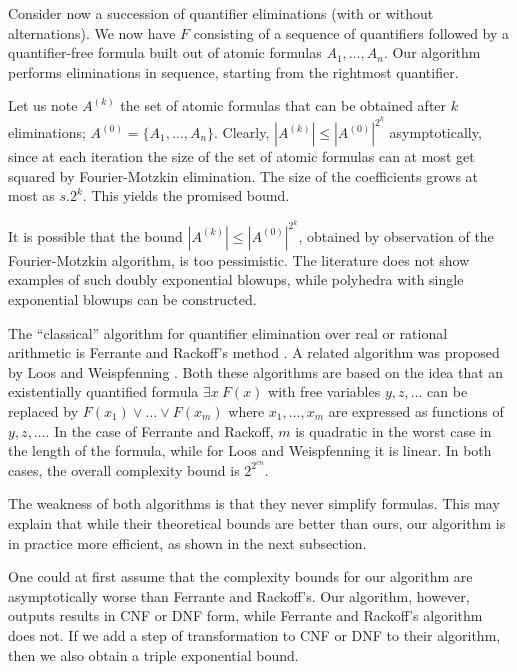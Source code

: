 Consider now a succession of quantifier eliminations (with or without alternations). We now have $F$ consisting of a sequence of quantifiers followed by a quantifier-free formula built out of atomic formulas $A_1,\dots,A_n$. Our algorithm performs eliminations in sequence, starting from the rightmost quantifier.

Let us note $A^{(k)}$ the set of atomic formulas that can be obtained after $k$ eliminations; $A^{(0)}=\{A_1,\dots,A_n\}$. Clearly, $|A^{(k)}| \leq |A^{(0)}|^{2^k}$ asymptotically, since at each iteration the size of the set of atomic formulas can at most get squared by Fourier-Motzkin elimination. The size of the coefficients grows at most as $s.2^k$. This yields the promised bound.

It is possible that the bound $|A^{(k)}| \leq |A^{(0)}|^{2^k}$, obtained by observation of the Fourier-Motzkin algorithm, is too pessimistic. The literature does not show examples of such doubly exponential blowups, while polyhedra with single exponential blowups can be constructed.









The ``classical'' algorithm for quantifier elimination over real or rational arithmetic is Ferrante and Rackoff's method \cite{FerranteRackoff75}\cite[\S 7.3]{BradleyManna07}\cite[\S 4.2]{NipkowIJCAR08}. A related algorithm was proposed by Loos and Weispfenning \cite{LoosWeispfenning93}\cite[\S 4.4]{NipkowIJCAR08}. Both these algorithms are based on the idea that an existentially quantified formula $\exists x~F(x)$ with free variables $y, z, \dots$ can be replaced by $F(x_1) \vee \dots \vee F(x_m)$ where $x_1,\dots,x_m$ are expressed as functions of $y,z,\dots$. In the case of Ferrante and Rackoff, $m$ is quadratic in the worst case in the length of the formula, while for Loos and Weispfenning it is linear. In both cases, the overall complexity bound is $2^{2^{cn}}$.

The weakness of both algorithms is that they never simplify formulas. This may explain that while their theoretical bounds are better than ours, our algorithm is in practice more efficient, as shown in the next subsection.

One could at first assume that the complexity bounds for our algorithm are asymptotically worse than Ferrante and Rackoff's. Our algorithm, however, outputs results in CNF or DNF form, while Ferrante and Rackoff's algorithm does not. If we add a step of transformation to CNF or DNF to their algorithm, then we also obtain a triple exponential bound.

